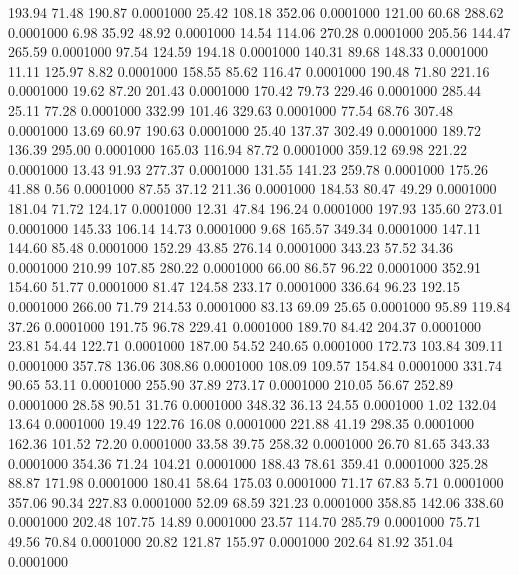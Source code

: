 193.94   71.48  190.87   0.0001000
  25.42  108.18  352.06   0.0001000
 121.00   60.68  288.62   0.0001000
   6.98   35.92   48.92   0.0001000
  14.54  114.06  270.28   0.0001000
 205.56  144.47  265.59   0.0001000
  97.54  124.59  194.18   0.0001000
 140.31   89.68  148.33   0.0001000
  11.11  125.97    8.82   0.0001000
 158.55   85.62  116.47   0.0001000
 190.48   71.80  221.16   0.0001000
  19.62   87.20  201.43   0.0001000
 170.42   79.73  229.46   0.0001000
 285.44   25.11   77.28   0.0001000
 332.99  101.46  329.63   0.0001000
  77.54   68.76  307.48   0.0001000
  13.69   60.97  190.63   0.0001000
  25.40  137.37  302.49   0.0001000
 189.72  136.39  295.00   0.0001000
 165.03  116.94   87.72   0.0001000
 359.12   69.98  221.22   0.0001000
  13.43   91.93  277.37   0.0001000
 131.55  141.23  259.78   0.0001000
 175.26   41.88    0.56   0.0001000
  87.55   37.12  211.36   0.0001000
 184.53   80.47   49.29   0.0001000
 181.04   71.72  124.17   0.0001000
  12.31   47.84  196.24   0.0001000
 197.93  135.60  273.01   0.0001000
 145.33  106.14   14.73   0.0001000
   9.68  165.57  349.34   0.0001000
 147.11  144.60   85.48   0.0001000
 152.29   43.85  276.14   0.0001000
 343.23   57.52   34.36   0.0001000
 210.99  107.85  280.22   0.0001000
  66.00   86.57   96.22   0.0001000
 352.91  154.60   51.77   0.0001000
  81.47  124.58  233.17   0.0001000
 336.64   96.23  192.15   0.0001000
 266.00   71.79  214.53   0.0001000
  83.13   69.09   25.65   0.0001000
  95.89  119.84   37.26   0.0001000
 191.75   96.78  229.41   0.0001000
 189.70   84.42  204.37   0.0001000
  23.81   54.44  122.71   0.0001000
 187.00   54.52  240.65   0.0001000
 172.73  103.84  309.11   0.0001000
 357.78  136.06  308.86   0.0001000
 108.09  109.57  154.84   0.0001000
 331.74   90.65   53.11   0.0001000
 255.90   37.89  273.17   0.0001000
 210.05   56.67  252.89   0.0001000
  28.58   90.51   31.76   0.0001000
 348.32   36.13   24.55   0.0001000
   1.02  132.04   13.64   0.0001000
  19.49  122.76   16.08   0.0001000
 221.88   41.19  298.35   0.0001000
 162.36  101.52   72.20   0.0001000
  33.58   39.75  258.32   0.0001000
  26.70   81.65  343.33   0.0001000
 354.36   71.24  104.21   0.0001000
 188.43   78.61  359.41   0.0001000
 325.28   88.87  171.98   0.0001000
 180.41   58.64  175.03   0.0001000
  71.17   67.83    5.71   0.0001000
 357.06   90.34  227.83   0.0001000
  52.09   68.59  321.23   0.0001000
 358.85  142.06  338.60   0.0001000
 202.48  107.75   14.89   0.0001000
  23.57  114.70  285.79   0.0001000
  75.71   49.56   70.84   0.0001000
  20.82  121.87  155.97   0.0001000
 202.64   81.92  351.04   0.0001000
